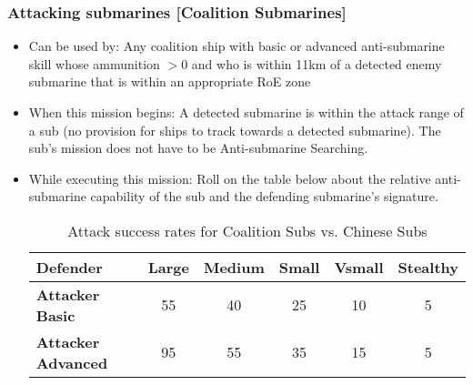 \documentclass{article}
\begin{document}
    \subsubsection{Attacking submarines [Coalition Submarines]}
        \begin{itemize}
            \item{Can be used by:} Any coalition ship with basic or advanced anti-submarine skill whose ammunition $>0$ and who is within 11km of a detected enemy submarine that is within an appropriate RoE zone
            \item{When this mission begins:} A detected submarine is within the attack range of a sub (no provision for ships to track towards a detected submarine). The sub's mission does not have to be Anti-submarine Searching.
            \item{While executing this mission:} Roll on the table below about the relative anti-submarine capability of the sub and the defending submarine's signature.
                \begin{table}[h!]
                    \centering
                    \begin{tabular}{lccccc}
                        \toprule
                        \textbf{Defender} & \textbf{Large} & \textbf{Medium} & \textbf{Small} & \textbf{Vsmall} & \textbf{Stealthy} \\
                        \midrule
                        \textbf{Attacker Basic}    & 55 & 40 & 25 & 10 & 5 \\
                        \textbf{Attacker Advanced} & 95 & 55 & 35 & 15 & 5 \\
                        \bottomrule
                    \end{tabular}
                    \caption{Attack success rates for Coalition Subs vs. Chinese Subs}
                    \label{tab:CoalitionSubmarinesVs.ChineseSubmarines}
                \end{table}
                

\end{itemize}
\end{document}
